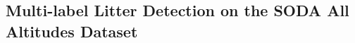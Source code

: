 

\subsection{Multi-label Litter Detection on the SODA All Altitudes Dataset}
\label{subsec:5_soda_tiled_multi_dataset_exp}


